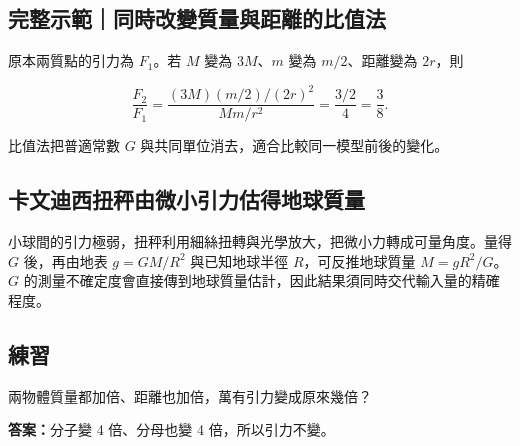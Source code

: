 \documentclass[11pt,a4paper]{article}
\begin{document}
\begin{HandoutWorkedExample}

\subsection{完整示範｜同時改變質量與距離的比值法}\label{ux5b8cux6574ux793aux7bc4ux540cux6642ux6539ux8b8aux8ceaux91cfux8207ux8dddux96e2ux7684ux6bd4ux503cux6cd5}

原本兩質點的引力為 \(F_1\)。若 \(M\) 變為 \(3M\)、\(m\) 變為 \(m/2\)、距離變為 \(2r\)，則

\[
\frac{F_2}{F_1}
=\frac{(3M)(m/2)/(2r)^2}{Mm/r^2}
=\frac{3/2}{4}
=\frac38.
\]

比值法把普適常數 \(G\) 與共同單位消去，適合比較同一模型前後的變化。

\end{HandoutWorkedExample}

\subsection{卡文迪西扭秤由微小引力估得地球質量}\label{ux5361ux6587ux8feaux897fux626dux79e4ux7531ux5faeux5c0fux5f15ux529bux4f30ux5f97ux5730ux7403ux8ceaux91cf}

小球間的引力極弱，扭秤利用細絲扭轉與光學放大，把微小力轉成可量角度。量得 \(G\) 後，再由地表 \(g=GM/R^2\) 與已知地球半徑 \(R\)，可反推地球質量 \(M=gR^2/G\)。\(G\) 的測量不確定度會直接傳到地球質量估計，因此結果須同時交代輸入量的精確程度。

\begin{HandoutSelfCheck}

\subsection{練習}\label{ux7df4ux7fd2}

兩物體質量都加倍、距離也加倍，萬有引力變成原來幾倍？

\textbf{答案：}分子變 4 倍、分母也變 4 倍，所以引力不變。

\end{HandoutSelfCheck}
\end{document}
